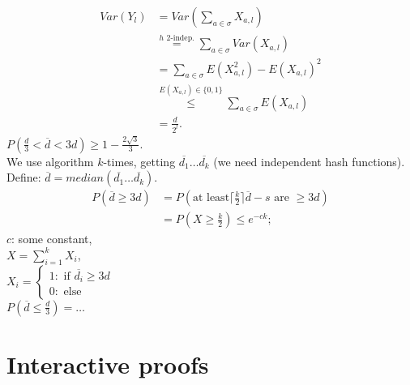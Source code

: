 \documentclass[a4paper, 12pt]{book}
\theoremstyle{definition}
\theoremstyle{remark}
\begin{document}
\begin{align*}
  Var(Y_l) &= Var\left(\sum_{a \in \sigma} X_{a, l}\right) \\
  &\stackrel{h \text{ 2-indep.}}{=} \sum_{a \in \sigma} Var(X_{a, l}) \\
  &= \sum_{a \in \sigma} E(X_{a, l}^2) - E(X_{a, l})^2 \\
  &\stackrel{E(X_{a,l}) \in \{0,1\}}{\leq} \sum_{a \in \sigma} E(X_{a, l}) \\
  &= \frac{d}{2^l}.
\end{align*}
$P\left(\frac{d}{3} < \overline{d} < 3d\right) \geq 1 - \frac{2 \sqrt{3}}{3}$. \\
We use algorithm $k$-times, getting $\overline{d_1} \dots \overline{d_k}$ (we need independent hash functions). \\
Define: $\overline{d} = median(\overline{d_1} \dots \overline{d_k})$. \\
\begin{align*}
  P(\overline{d} \geq 3d) &= P(\text{at least} \lceil \frac{k}{2} \rceil \overline{d}-s \text{ are } \geq 3d) \\
  &= P(X \geq \frac{k}{2}) \leq e^{-ck};
\end{align*}
$c$: some constant, \\
$X = \sum_{i=1}^{k} X_i$, \\
$X_i = \begin{cases}
  1: \text{ if } \overline{d_i} \geq 3d \\
  0: \text{ else}
\end{cases}$ \\
$P\left(\overline{d} \leq \frac{d}{3}\right) = \dots$



\chapter{Interactive proofs}
\end{document}
